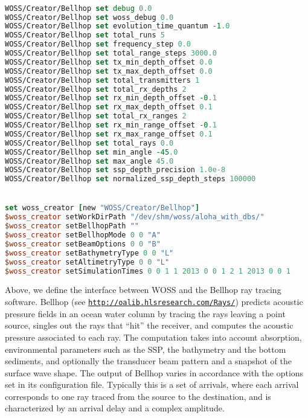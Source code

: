 \documentclass[11pt]{article}
\begin{document}
{\scriptsize\tt
\begin{lstlisting}[language=tcl]
WOSS/Creator/Bellhop set debug 0.0
WOSS/Creator/Bellhop set woss_debug 0.0
WOSS/Creator/Bellhop set evolution_time_quantum -1.0
WOSS/Creator/Bellhop set total_runs 5
WOSS/Creator/Bellhop set frequency_step 0.0
WOSS/Creator/Bellhop set total_range_steps 3000.0
WOSS/Creator/Bellhop set tx_min_depth_offset 0.0
WOSS/Creator/Bellhop set tx_max_depth_offset 0.0
WOSS/Creator/Bellhop set total_transmitters 1
WOSS/Creator/Bellhop set total_rx_depths 2
WOSS/Creator/Bellhop set rx_min_depth_offset -0.1
WOSS/Creator/Bellhop set rx_max_depth_offset 0.1
WOSS/Creator/Bellhop set total_rx_ranges 2
WOSS/Creator/Bellhop set rx_min_range_offset -0.1
WOSS/Creator/Bellhop set rx_max_range_offset 0.1
WOSS/Creator/Bellhop set total_rays 0.0
WOSS/Creator/Bellhop set min_angle -45.0
WOSS/Creator/Bellhop set max_angle 45.0
WOSS/Creator/Bellhop set ssp_depth_precision 1.0e-8
WOSS/Creator/Bellhop set normalized_ssp_depth_steps 100000


set woss_creator [new "WOSS/Creator/Bellhop"]
$woss_creator setWorkDirPath "/dev/shm/woss/aloha_with_dbs/"
$woss_creator setBellhopPath ""
$woss_creator setBellhopMode 0 0 "A"
$woss_creator setBeamOptions 0 0 "B"
$woss_creator setBathymetryType 0 0 "L"
$woss_creator setAltimetryType 0 0 "L"
$woss_creator setSimulationTimes 0 0 1 1 2013 0 0 1 2 1 2013 0 0 1
\end{lstlisting}
}

Above, we define the interface between WOSS and the Bellhop ray tracing software. Bellhop (see {\tt \url{http://oalib.hlsresearch.com/Rays/}}) predicts acoustic pressure fields in an ocean water column by tracing the rays leaving a point source, singles out the rays that ``hit'' the receiver, and computes the acoustic pressure associated to each ray. The computation takes into account absorption, environmental parameters such as the SSP, the bathymetry and the bottom sediments, and optionally the transducer beam pattern and a snapshot of the surface wave shape.
The output of Bellhop varies in accordance with the options set in its configuration file. Typically this is a set of arrivals, where each arrival corresponds to one ray traced from the source to the destination, and is characterized by an arrival delay and a complex amplitude. 
\end{document}
